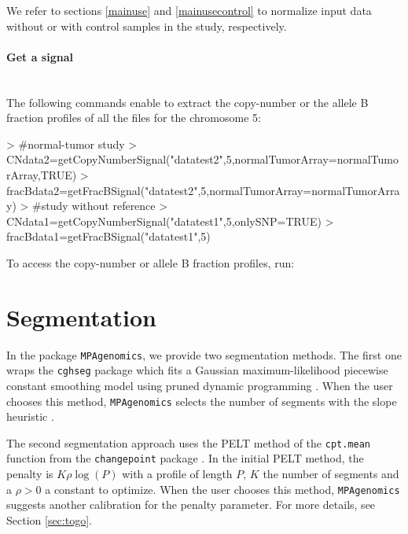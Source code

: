 \documentclass[a4paper,10pt]{article}
\begin{document}
  We refer to sections \ref{mainuse} and \ref{mainusecontrol} to normalize input data without or with control samples in the study, respectively.	

\paragraph*{Get a signal}~~\\
		The following commands enable to extract the copy-number or the allele B fraction profiles of all the files for the chromosome 5:
		
\begin{Schunk}
\begin{Sinput}
> #normal-tumor study
> CNdata2=getCopyNumberSignal("datatest2",5,normalTumorArray=normalTumorArray,TRUE)
> fracBdata2=getFracBSignal("datatest2",5,normalTumorArray=normalTumorArray)
> #study without reference
> CNdata1=getCopyNumberSignal("datatest1",5,onlySNP=TRUE)	
> fracBdata1=getFracBSignal("datatest1",5)		
\end{Sinput}
\end{Schunk}
		
		To access the copy-number or allele B fraction profiles, run:
\begin{Schunk}
\end{Schunk}
				


\section{Segmentation}
	\label{sec:seg}
	
	In the package \texttt{MPAgenomics}, we provide two segmentation methods.
  The first one wraps the \texttt{cghseg} package which fits a Gaussian maximum-likelihood piecewise constant smoothing model \cite{cghsegb} using pruned dynamic programming \cite{cghseg}. When the user chooses this method, \texttt{MPAgenomics} selects the number of segments with the slope heuristic \cite{heurpente}. 
  
  The second segmentation approach uses the PELT method of the \texttt{cpt.mean} function from the \texttt{changepoint} package \cite{peltR}.
	In the initial PELT method, the penalty is $K\rho\log(P)$ with a profile of length $P$, $K$ the number of segments and a $\rho>0$ a constant to optimize. When the user chooses this method, \texttt{MPAgenomics} suggests another calibration for the penalty parameter. For more details, see Section \ref{sec:togo}.
  
\end{document}

